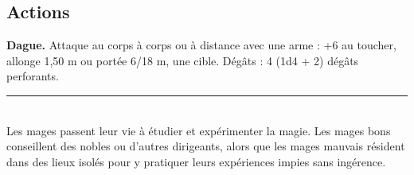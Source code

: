 \begin{figure*}[hb!]
{\begin{minipage}[c]{.45\linewidth}
    \subsection*{Actions}
    {\bfseries Dague.} Attaque au corps à corps ou à distance avec une arme : +6 au toucher, allonge 1,50 m ou portée 6/18 m, une cible. Dégâts : 4 (1d4 + 2) dégâts perforants. \\
    \noindent\rule{\textwidth}{1pt} \\
Les mages passent leur vie à étudier et expérimenter la magie. Les mages bons conseillent des nobles ou d'autres dirigeants, alors que les mages mauvais résident dans des lieux isolés pour y pratiquer leurs expériences impies sans ingérence.
  \end{minipage}
}%
\end{figure*}


